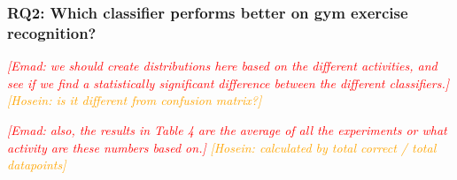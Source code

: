 \documentclass[journal,article,submit,moreauthors,pdftex]{Definitions/mdpi}
\newcommand{\emad}[1]{\textcolor{red}{{\it [Emad: #1]}}}
\newcommand{\hosein}[1]{\textcolor{orange}{{\it [Hosein: #1]}}}
\begin{document}

\subsubsection{RQ2: Which classifier performs better on gym exercise recognition?}

\emad{we should create distributions here based on the different activities, and see if we find a statistically significant difference between the different classifiers.} \hosein{is it different from confusion matrix?}

\emad{also, the results in Table 4 are the average of all the experiments or what activity are these numbers based on.} \hosein{calculated by total correct / total datapoints}
\end{document}
